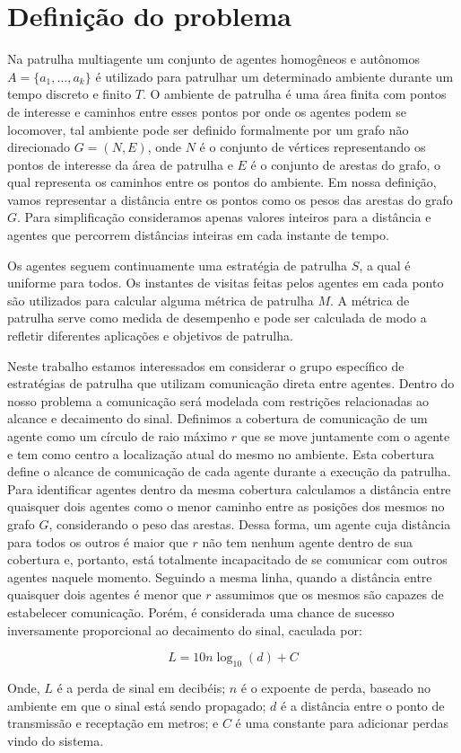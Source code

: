 \chapter{Definição do problema} 
\label{chp:problem}

Na patrulha multiagente um conjunto de agentes homogêneos e autônomos $A =
\{a_{1}, ..., a_{k}\}$ é utilizado para patrulhar um determinado ambiente
durante um tempo discreto e finito $T$. O ambiente de patrulha é uma área finita
com pontos de interesse e caminhos entre esses pontos por onde os agentes podem
se locomover, tal ambiente pode ser definido formalmente por um grafo não
direcionado $G = (N, E)$, onde $N$ é o conjunto de vértices representando os
pontos de interesse da área de patrulha e $E$ é o conjunto de arestas do grafo,
o qual representa os caminhos entre os pontos do ambiente. Em nossa definição,
vamos representar a distância entre os pontos como os pesos das arestas do grafo
$G$. Para simplificação consideramos apenas valores inteiros para a distância e
agentes que percorrem distâncias inteiras em cada instante de tempo.

Os agentes seguem continuamente uma estratégia de patrulha $S$, a qual é
uniforme para todos. Os instantes de visitas feitas pelos agentes em cada ponto
são utilizados para calcular alguma métrica de patrulha $M$. A métrica de
patrulha serve como medida de desempenho e pode ser calculada de modo a refletir
diferentes aplicações e objetivos de patrulha.

Neste trabalho estamos interessados em considerar o grupo específico de
estratégias de patrulha que utilizam comunicação direta entre agentes. Dentro do
nosso problema a comunicação será modelada com restrições relacionadas ao
alcance e decaimento do sinal. Definimos a cobertura de comunicação de um agente
como um círculo de raio máximo $r$ que se move juntamente com o agente e tem
como centro a localização atual do mesmo no ambiente. Esta cobertura define o
alcance de comunicação de cada agente durante a execução da patrulha. Para
identificar agentes dentro da mesma cobertura calculamos a distância entre
quaisquer dois agentes como o menor caminho entre as posições dos mesmos no
grafo $G$, considerando o peso das arestas. Dessa forma, um agente cuja
distância para todos os outros é maior que $r$ não tem nenhum agente dentro de
sua cobertura e, portanto, está totalmente incapacitado de se comunicar com
outros agentes naquele momento. Seguindo a mesma linha, quando a distância entre
quaisquer dois agentes é menor que $r$ assumimos que os mesmos são capazes de
estabelecer comunicação. Porém, é considerada uma chance de sucesso inversamente
proporcional ao decaimento do sinal, caculada por:

$$L = 10 n \log_{10}(d) + C$$

Onde, $L$ é a perda de sinal em decibéis; $n$ é o expoente de perda, baseado no
ambiente em que o sinal está sendo propagado; $d$ é a distância entre o ponto de
transmissão e receptação em metros; e $C$ é uma constante para adicionar perdas
vindo do sistema.